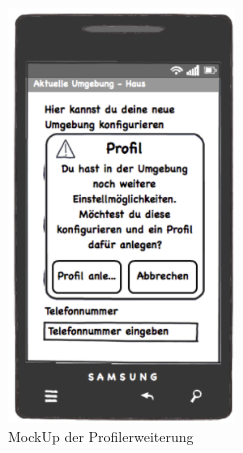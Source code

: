 \begin{figure}[H]
\includegraphics[width=6cm]{MockUps/Erweiterung}
\caption{MockUp der Profilerweiterung}
\end{figure}

